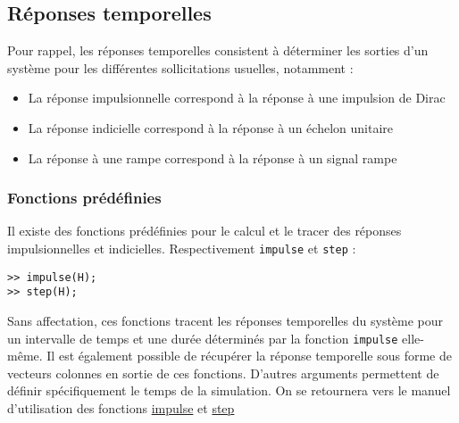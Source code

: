 \subsection{Réponses temporelles}
Pour rappel, les réponses temporelles consistent à déterminer les sorties 
d'un système pour les différentes sollicitations usuelles, notamment :
\begin{itemize}
    \item La réponse impulsionnelle correspond à la réponse à une impulsion de Dirac
    \item La réponse indicielle correspond à la réponse à un échelon unitaire
    \item La réponse à une rampe correspond à la réponse à un signal rampe
\end{itemize}
\subsubsection{Fonctions prédéfinies}
Il existe des fonctions prédéfinies pour le calcul et le tracer des 
réponses impulsionnelles et indicielles. Respectivement \texttt{impulse} et \texttt{step} :
\begin{verbatim}
>> impulse(H);
>> step(H);
\end{verbatim}
Sans affectation, ces fonctions tracent les réponses temporelles du système pour 
un intervalle de temps et une durée déterminés par la fonction \texttt{impulse} 
elle-même.
Il est également possible de récupérer la réponse temporelle sous forme 
de vecteurs colonnes en sortie de ces fonctions. D'autres arguments permettent 
de définir spécifiquement le temps de la simulation.
On se retournera vers le manuel d'utilisation des 
fonctions \href{https://fr.mathworks.com/help/control/ref/dynamicsystem.impulse.html}{impulse} 
et \href{https://fr.mathworks.com/help/control/ref/dynamicsystem.step.html}{step}~\cite{impulse,step}
